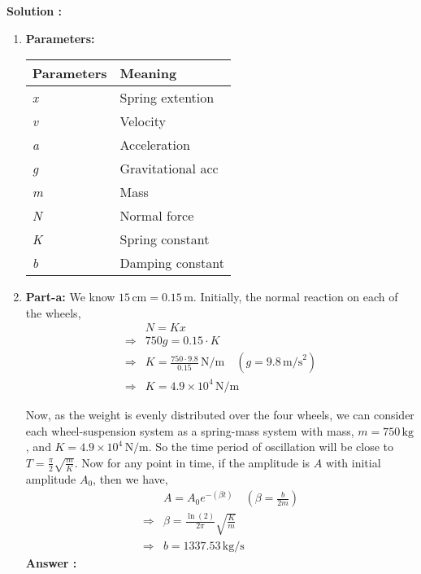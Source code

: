 \documentclass[journal,12pt,twocolumn]{IEEEtran}
\theoremstyle{remark}
\begin{document}
\textbf{Solution :}
\begin{enumerate}
\item \textbf{Parameters:}
    \begin{table}[h]
\begin{tabular}{l|l}
\hline
\textbf{Parameters} & \textbf{Meaning}  \\ \hline
\textit{x}          & Spring extention  \\ \hline
\textit{v}          & Velocity          \\ \hline
\textit{a}          & Acceleration      \\ \hline
\textit{g}          & Gravitational acc \\ \hline
\textit{m}          & Mass              \\ \hline
\textit{N}          & Normal force      \\ \hline
\textit{K}          & Spring constant   \\ \hline
\textit{b}          & Damping constant  \\ \hline
\end{tabular}
\end{table}




\item \textbf{Part-a:}
    We know \(15\, \text{cm} = 0.15\, \text{m}\). Initially, the normal reaction on each of the wheels,
    \begin{align}
&N = Kx \\
\Rightarrow &750g = 0.15 \cdot K \quad \\
\Rightarrow &K = \frac{750 \cdot 9.8}{0.15}\, \text{N/m} \quad (g = 9.8\, \text{m/s}^2) \\
\Rightarrow &K = 4.9 \times 10^4\, \text{N/m}
    \end{align}


Now, as the weight is evenly distributed over the four wheels, we can consider each wheel-suspension system as a spring-mass system with mass, \(m = 750\, \text{kg}\), and \(K = 4.9 \times 10^4\, \text{N/m}\). So the time period of oscillation will be close to \(T = \frac{\pi}{2} \sqrt{\frac{m}{K}}\).
Now for any point in time, if the amplitude is \(A\) with initial amplitude \(A_{\text{0}}\), then we have,
    \begin{align}
&A = A_{\text{0}}e^{-(\beta t)} \quad (\beta = \frac{b}{2m}) \\
\Rightarrow &\beta = \frac{\ln(2)}{2\pi} \sqrt{\frac{K}{m}} \quad \\
\Rightarrow &b = 1337.53\, \text{kg/s}
    \end{align}
\textbf{Answer :}


\end{enumerate}
\end{document}
